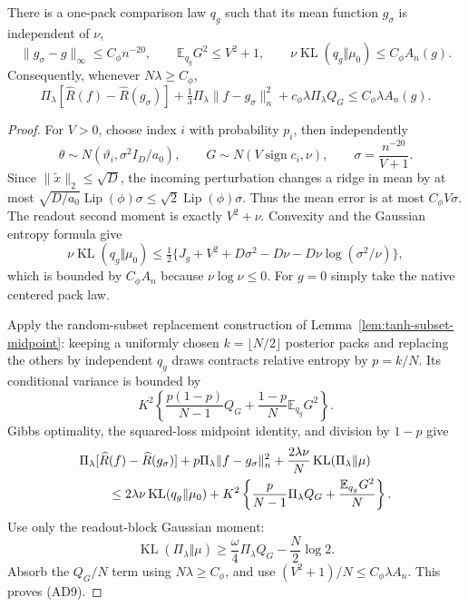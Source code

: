 \begin{lemma}
\label{lem:all-d-comparison}
There is a one-pack comparison law $q_g$ such that its mean function
$g_\sigma$ is independent of $\nu$,
\[
 \|g_\sigma-g\|_\infty\le C_\phi n^{-20},\qquad
 \mathbb E_{q_g}G^2\le V^2+1,
 \qquad
 \nu\operatorname{KL}(q_g\Vert\mu_0)\le C_\phi A_n(g).  \tag{AD8}
\]
Consequently, whenever $N\lambda\ge C_\phi$,
\[
 \Pi_\lambda[\widehat R(f)-\widehat R(g_\sigma)]
 +\tfrac13\Pi_\lambda\|f-g_\sigma\|_n^2
 +c_\phi\lambda\Pi_\lambda Q_G
 \le C_\phi\lambda A_n(g).                             \tag{AD9}
\]
\end{lemma}
\begin{proof}
For $V>0$, choose index $i$ with probability $p_i$, then independently
\[
 \theta\sim N(\vartheta_i,\sigma^2I_D/a_0),\qquad
 G\sim N(V\operatorname{sign}c_i,\nu),\qquad
 \sigma=\frac{n^{-20}}{V+1}.
\]
Since $\|\widetilde x\|_2\le\sqrt D$, the incoming perturbation
changes a ridge in mean by at most
$\sqrt{D/a_0}\operatorname{Lip}(\phi)\sigma
 \le\sqrt2\operatorname{Lip}(\phi)\sigma$.
Thus the mean error is at most $C_\phi V\sigma$.
The readout second moment is exactly $V^2+\nu$.
Convexity and the Gaussian entropy formula give
\[
 \nu\operatorname{KL}(q_g\Vert\mu_0)
 \le\tfrac12\{J_g+V^2+D\sigma^2-D\nu
                     -D\nu\log(\sigma^2/\nu)\},
\]
which is bounded by $C_\phi A_n$ because $\nu\log\nu\le0$.
For $g=0$ simply take the native centered pack law.

Apply the random-subset replacement construction of
Lemma~\ref{lem:tanh-subset-midpoint}: keeping a uniformly
chosen $k=\lfloor N/2\rfloor$ posterior packs and replacing the others
by independent $q_g$ draws contracts relative entropy by $p=k/N$.
Its conditional variance is bounded by
\[
 K^2\left\{\frac{p(1-p)}{N-1}Q_G
             +\frac{1-p}{N}\mathbb E_{q_g}G^2\right\}.
\]
Gibbs optimality, the squared-loss midpoint identity, and division by
$1-p$ give
\begin{align*}
 &\Pi_\lambda[\widehat R(f)-\widehat R(g_\sigma)]
 +p\Pi_\lambda\|f-g_\sigma\|_n^2
 +\frac{2\lambda\nu}{N}\operatorname{KL}(\Pi_\lambda\Vert\mu)\\
 &\hspace{8mm}\le2\lambda\nu\operatorname{KL}(q_g\Vert\mu_0)
 +K^2\left\{\frac p{N-1}\Pi_\lambda Q_G
                  +\frac{\mathbb E_{q_g}G^2}N\right\}.
\end{align*}
Use only the readout-block Gaussian moment:
\[
 \operatorname{KL}(\Pi_\lambda\Vert\mu)
 \ge\frac\omega4\Pi_\lambda Q_G-\frac N2\log2.
\]
Absorb the $Q_G/N$ term using $N\lambda\ge C_\phi$, and use
$(V^2+1)/N\le C_\phi\lambda A_n$. This proves (AD9).
\end{proof}

